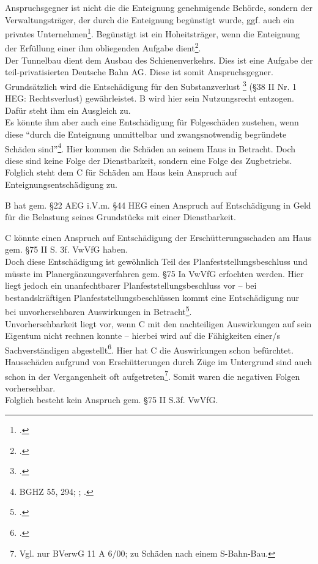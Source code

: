 \documentclass[widefront, ngerman]{jura}
\begin{document}
Anspruchsgegner ist nicht die die Enteignung genehmigende Behörde, sondern der Verwaltungsträger, der durch die Enteignung begünstigt wurde, ggf. auch ein privates Unternehmen\footcite[S. 212]{Ossenbuehl}. Begünstigt ist ein Hoheitsträger, wenn die Enteignung der Erfüllung einer ihm obliegenden Aufgabe dient\footcite[Grzeszick][§45 Rn 34]{Ehlers}.\\
Der Tunnelbau dient dem Ausbau des Schienenverkehrs. Dies ist eine Aufgabe der teil-privatisierten Deutsche Bahn AG. Diese ist somit Anspruchsgegner.\\
Grundsätzlich wird die Entschädigung für den Substanzverlust \footcite[§16 Rn 145]{DetterbeckStaatshaftung} (§38 II Nr. 1 HEG: Rechtsverlust) gewährleistet. B wird hier sein Nutzungsrecht entzogen. Dafür steht ihm ein Ausgleich zu.\\
Es könnte ihm aber auch eine Entschädigung für Folgeschäden zustehen, wenn diese "`durch die Enteignung unmittelbar und zwangsnotwendig begründete Schäden sind"'\footnote{BGHZ 55, 294; \cite[S. 210]{Ossenbuehl}; \cite[Rn 313f.]{Kreft}.}. Hier kommen die Schäden an seinem Haus in Betracht. Doch diese sind keine Folge der Dienstbarkeit, sondern eine Folge des Zugbetriebs. \\
Folglich steht dem C für Schäden am Haus kein Anspruch auf Enteignungsentschädigung zu.

B hat gem. §22 AEG i.V.m. §44 HEG einen Anspruch auf Entschädigung in Geld für die Belastung seines Grundstücks mit einer Dienstbarkeit.

\levelup{}

C könnte einen Anspruch auf Entschädigung der Erschütterungsschaden am Haus gem. §75 II S. 3f. VwVfG haben. \\
Doch diese Entschädigung ist gewöhnlich Teil des Planfeststellungsbeschluss und müsste im Planergänzungsverfahren gem. §75 Ia VwVfG erfochten werden. Hier liegt jedoch ein unanfechtbarer Planfeststellungsbeschluss vor -- bei bestandskräftigen Planfeststellungsbeschlüssen kommt eine Entschädigung nur bei unvorhersehbaren Auswirkungen in Betracht\footcite[Dürr][§75 Rn 81]{Knack}.\\
Unvorhersehbarkeit liegt vor, wenn C mit den nachteiligen Auswirkungen auf sein Eigentum nicht rechnen konnte -- hierbei wird auf die Fähigkeiten einer/s Sachverständigen abgestellt\footcite[Dürr][§75 Rn 88]{Knack}. Hier hat C die Auswirkungen schon befürchtet. Hausschäden aufgrund von Erschütterungen durch Züge im Untergrund sind auch schon in der Vergangenheit oft aufgetreten\footnote{Vgl. nur BVerwG 11 A 6/00; zu Schäden nach einem S-Bahn-Bau.}. Somit waren die negativen Folgen vorhersehbar.\\
Folglich besteht kein Anspruch gem. §75 II S.3f. VwVfG.
\end{document}

